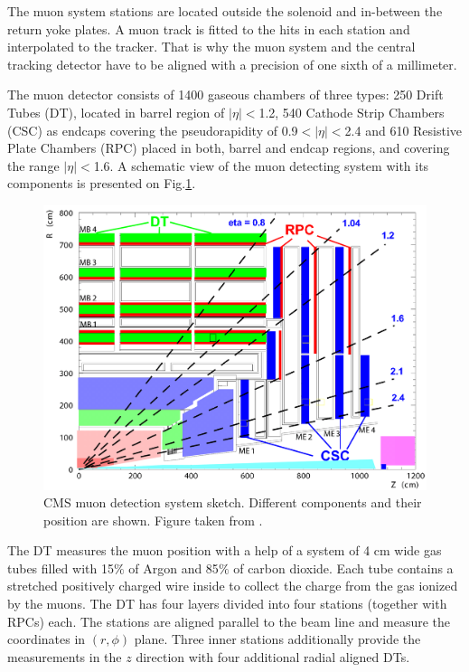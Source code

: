 The muon system stations are located outside the solenoid and in-between the return yoke plates. A muon track is fitted to the hits in each station 
and interpolated to the tracker. That is why the muon system and the central tracking detector have to be aligned with a precision of one sixth of a millimeter.

The muon detector consists of 1400 gaseous chambers of three types: 250 Drift Tubes (DT), located in barrel region of $|\eta| < $1.2, 540 Cathode Strip Chambers
(CSC) as endcaps covering the pseudorapidity of 0.9$ < |\eta| < $2.4 and 610 Resistive Plate Chambers (RPC) placed in both, barrel and endcap regions, and covering
the range $|\eta| < $1.6. A schematic view of the muon detecting system with its components is presented on Fig.\ref{fig:muond}.

\begin{figure}[t]
  \centering
  \includegraphics[width=1.0\textwidth]{02_experimental_setup/plots/Figures_Experimental_Apparatus_MuonDetector.png}
  \caption{CMS muon detection system sketch. Different components and their position are shown. Figure taken from \cite{CMSatLHC}.}
  \label{fig:muond}
\end{figure}

The DT measures the muon position with a help of a system of 4 cm wide gas tubes filled with 15$\%$ of Argon and 85$\%$ of carbon dioxide.
Each tube contains a stretched positively charged wire inside to collect the charge from the gas ionized by the muons. The DT has four layers
divided into four stations (together with RPCs) each. The stations are aligned parallel to the beam line and measure the coordinates in $(r,\phi)$
plane. Three inner stations additionally provide the measurements in the $z$ direction with four additional radial aligned DTs.

